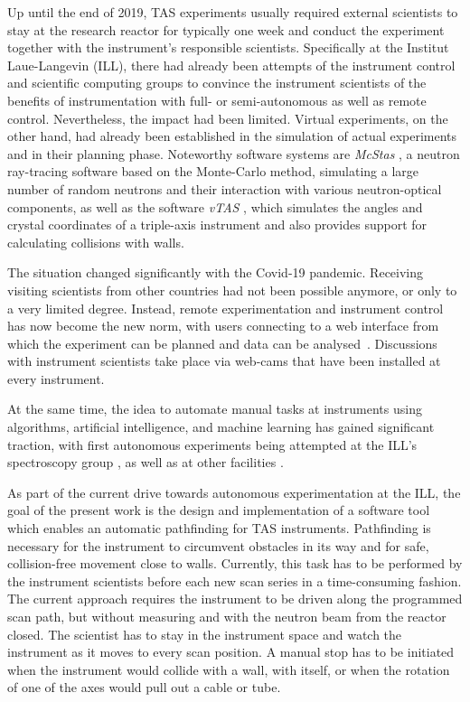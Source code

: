 Up until the end of 2019, TAS experiments usually required external scientists to stay at the research reactor for
typically one week and conduct the experiment together with the instrument's responsible scientists. Specifically
at the Institut Laue-Langevin (ILL), there had already been attempts \cite{Song2020} of the instrument control
and scientific computing groups to convince the instrument scientists of the benefits of instrumentation with full- or
semi-autonomous as well as remote control. Nevertheless, the impact had been limited.
Virtual experiments, on the other hand, had already been established in the simulation of actual experiments and in their
planning phase. Noteworthy software systems are \textit{McStas} \cite{McStas2020, McStas2021}, a neutron ray-tracing software based on the
Monte-Carlo method, simulating a large number of random neutrons and their interaction with various neutron-optical components,
as well as the software \textit{vTAS} \cite{vTAS2013}, which simulates the angles and crystal coordinates of a triple-axis
instrument and also provides support for calculating collisions with walls.

The situation changed significantly with the Covid-19 pandemic. Receiving visiting scientists from other countries had
not been possible anymore, or only to a very limited degree. Instead, remote experimentation and instrument control has
now become the new norm, with users connecting to a web interface from which the experiment can be planned and data can
be analysed~\cite{web_ill_visa}.
Discussions with instrument scientists take place via web-cams that have been installed at every instrument.

At the same time, the idea to automate manual tasks at instruments using algorithms, artificial intelligence,
and machine learning \cite{web_gpcam} has gained significant traction, with first autonomous experiments being
attempted at the ILL's spectroscopy group \cite{web_ill_autonomous2020, Noack2021}, as well as at other
facilities \cite{Parente2021}.

As part of the current drive towards autonomous experimentation at the ILL, the goal of the present work is the design
and implementation of a software tool which enables an automatic pathfinding for TAS instruments. Pathfinding
is necessary for the instrument to circumvent obstacles in its way and for safe, collision-free movement close to walls.
Currently, this task has to be performed by the instrument scientists before each new scan series in a time-consuming fashion.
The current approach requires the instrument to be driven along the programmed scan path, but without measuring and with
the neutron beam from the reactor closed.
The scientist has to stay in the instrument space and watch the instrument as it moves to every scan position.
A manual stop has to be initiated when the instrument would collide with a wall, with itself, or when the rotation of one
of the axes would pull out a cable or tube.

